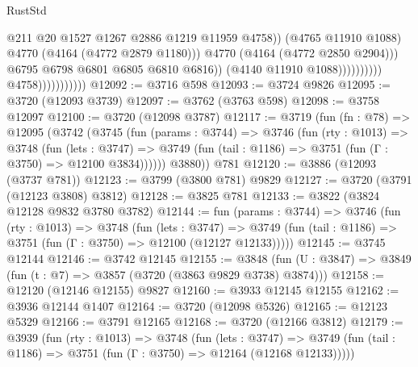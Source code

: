 \begin{lexlean}{RustStd}
\begin{coremodule}
                                                        @211
                                                        @20
                                                        @1527
                                                        @1267
                                                        @2886
                                                        @1219
                                                        @11959
                                                        @4758))
                                                    (@4765 @11910 @1088)
                                                    @4770
                                                    (@4164 (@4772 @2879 @1180)))
                                                  @4770
                                                  (@4164 (@4772 @2850 @2904)))
                                                @6795
                                                @6798
                                                @6801
                                                @6805
                                                @6810
                                                @6816))
                                            (@4140 @11910 @1088))))))))))
                          @4758)))))))))))
@12092 := @3716 @598
@12093 := @3724 @9826
@12095 := @3720 (@12093 @3739)
@12097 := @3762 (@3763 @598)
@12098 := @3758 @12097
@12100 := @3720 (@12098 @3787)
@12117 := @3719
    (fun (fn : @78) =>
    @12095
      (@3742
        (@3745
          (fun (params : @3744) =>
          @3746
            (fun (rty : @1013) =>
            @3748
              (fun (lets : @3747) =>
              @3749 (fun (tail : @1186) => @3751 (fun (Γ : @3750) => @12100 @3834))))))
        @3880))
    @781
@12120 := @3886 (@12093 (@3737 @781))
@12123 := @3799 (@3800 @781) @9829
@12127 := @3720 (@3791 (@12123 @3808) @3812)
@12128 := @3825 @781
@12133 := @3822 (@3824 @12128 @9832 @3780 @3782)
@12144 := fun (params : @3744) =>
  @3746
    (fun (rty : @1013) =>
    @3748
      (fun (lets : @3747) =>
      @3749 (fun (tail : @1186) => @3751 (fun (Γ : @3750) => @12100 (@12127 @12133)))))
@12145 := @3745 @12144
@12146 := @3742 @12145
@12155 := @3848 (fun (U : @3847) => @3849 (fun (t : @7) => @3857 (@3720 (@3863 @9829 @3738) @3874)))
@12158 := @12120 (@12146 @12155) @9827
@12160 := @3933 @12145 @12155
@12162 := @3936 @12144 @1407
@12164 := @3720 (@12098 @5326)
@12165 := @12123 @5329
@12166 := @3791 @12165
@12168 := @3720 (@12166 @3812)
@12179 := @3939
    (fun (rty : @1013) =>
    @3748
      (fun (lets : @3747) =>
      @3749 (fun (tail : @1186) => @3751 (fun (Γ : @3750) => @12164 (@12168 @12133)))))

\end{coremodule}
\end{lexlean}
